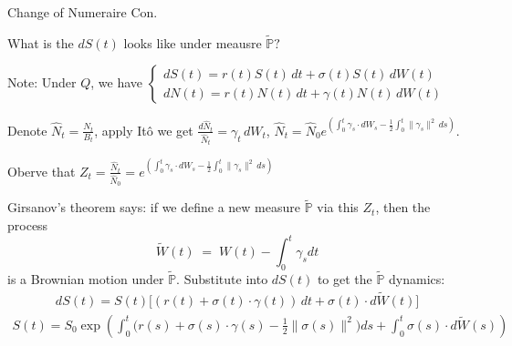 \documentclass{beamer}
\begin{document}
\begin{frame}{Change of Numeraire Con.}

    {\footnotesize \footnotesize
    \par What is the $dS(t)$ looks like under meausre $\tilde{\mathbb{P}}?$
    \par Note: Under $Q$, we have $\begin{cases}
        dS(t) = r(t) S(t) \,dt + \sigma(t) S(t) \,dW(t)\\dN(t) = r(t) N(t) \,dt + \gamma(t) N(t) \,dW(t)
    \end{cases}$
    \par Denote $\widehat N_t = \frac{N_t}{B_t}$, apply Itô we get
     $\frac{d\widehat N_t}{\widehat N_t}=\gamma_t\,dW_t$, $\widehat N_t
    = \widehat N_0 e^{\left(
      \int_0^t \gamma_s \cdot dW_s
      - \frac{1}{2} \int_0^t \|\gamma_s\|^2 \, ds
    \right)}.$
    \par Oberve that $Z_t  = \frac{\widehat N_t}{\widehat N_0} = e^{\left(
      \int_0^t \gamma_s \cdot dW_s
      - \frac{1}{2} \int_0^t \|\gamma_s\|^2 \, ds
    \right)}$
    \par Girsanov's theorem says: if we define a new measure $\tilde{\mathbb{P}}$ via this $Z_t$, then the process
            \[
        \tilde{W}(t) \;=\; W(t) - \int_{0}^{t}\gamma_sdt
            \]
        is a Brownian motion under $\tilde{\mathbb{P}}$. Substitute into $dS(t)$ to get the $\tilde{\mathbb{P}}$ dynamics:
        \begin{align*}
            dS(t) = S(t)\Big[ (r(t) + \sigma(t) \cdot \gamma(t))\,dt + \sigma(t)  \cdot d\tilde{W}(t) \Big]
        \end{align*}
        \begin{align*}
            S(t)
           = S_0 \exp\!\left(
            \int_0^t \!\Big(r(s) + \sigma(s) \!\cdot\!\gamma(s) - \tfrac12 \|\sigma(s)\|^2\Big) ds
            + \int_0^t \!\sigma(s) \!\cdot\! d\tilde{W}(s)\right)
        \end{align*}
    }
    
\end{frame}
\end{document}
